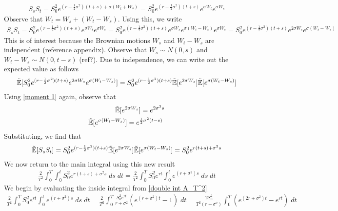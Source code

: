 \documentclass[reqno]{amsart}
\newcommand{\rE}[1]{\tilde{\E}[#1]}
\begin{document}
\begin{align}
     S_{s} S_{t} 
     = S_0^2 e^{(r-\frac{1}{2}\sigma^2)(t+s)+\sigma(W_t+W_s)}
     = S_0^2 e^{(r-\frac{1}{2}\sigma^2)(t+s)} e^{\sigma W_t} e^{\sigma W_s}
\end{align}
Observe that $W_t = W_s + (W_t - W_s)$. Using this, we write
\begin{align}
     S_{s} S_{t} 
     = S_0^2 e^{(r-\frac{1}{2}\sigma^2)(t+s)} e^{\sigma W_t} e^{\sigma W_s}
     = S_0^2 e^{(r-\frac{1}{2}\sigma^2)(t+s)} e^{\sigma W_s} e^{\sigma (W_t - W_s)} e^{\sigma W_s}
     = S_0^2 e^{(r-\frac{1}{2}\sigma^2)(t+s)} e^{2 \sigma W_s} e^{\sigma (W_t - W_s)}
\end{align}
This is of interest because the Brownian motions $W_s$ and $W_t - W_s$ are independent (reference appendix).
Observe that $W_s \sim N(0, s)$ and $W_t - W_s \sim N(0, t-s)$ (ref?). Due to independence, we can write out the expected value as follows
\begin{align}
     \rE{S_0^2 e^{(r-\frac{1}{2}\sigma^2)(t+s)}e^{2 \sigma W_s} e^{\sigma (W_t - W_s)}}
     = S_0^2 e^{(r-\frac{1}{2}\sigma^2)(t+s)} \rE{e^{2 \sigma W_s}} \rE{e^{\sigma (W_t - W_s)}}
\end{align}
Using \eqref{moment 1} again, observe that
\begin{align}
     \rE{e^{2 \sigma W_s}} = e^{2 \sigma^2 s} \\
     \rE{e^{\sigma (W_t - W_s)}} = e^{\frac{1}{2} \sigma^2 (t-s)} \;
\end{align}
Substituting, we find that
\begin{align}
     \rE{S_{s} S_{t}} 
     = S_0^2 e^{(r-\frac{1}{2}\sigma^2)(t+s)} \rE{e^{2 \sigma W_s}} \rE{e^{\sigma (W_t - W_s)}}
     = S_0^2 e^{r(t+s)+\sigma^2s}
\end{align}
We now return to the main integral using this new result
\begin{align} \label{double int A_T^2}
     \frac{2}{T^2} \int_0^T \int_0^t S_0^2 e^{r(t+s)+\sigma^2s} \; ds \; dt = \frac{2}{T^2} \int_0^T S_0^2 e^{rt} \int_0^t e^{(r + \sigma^2)s} \; ds \; dt
\end{align}
We begin by evaluating the inside integral from \eqref{double int A_T^2}
\begin{align}
     \frac{2}{T^2} \int_0^T S_0^2 e^{rt} \int_0^t e^{(r + \sigma^2)s} \; ds \; dt = \frac{2}{T^2} \int_0^T \frac{S_0^2 e^{rt}}{r + \sigma^2} (e^{(r+\sigma^2)t} - 1) \; dt = \frac{2 S_0^2}{T^2(r + \sigma^2)} \int_0^T  (e^{(2r+\sigma^2)t} - e^{rt}) \; dt
\end{align}
\end{document}
